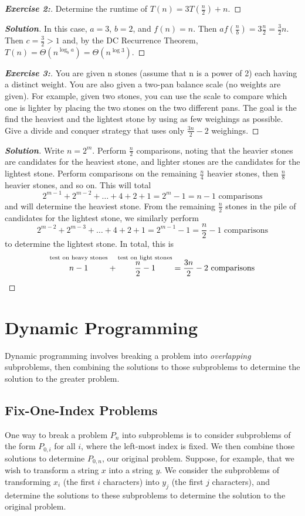 \documentclass[a4paper]{article}
\newenvironment{solution}{\begin{proof}[\textnormal{\textbf{Solution}}]}{\end{proof}}
\newenvironment{exercise}[1]{\begin{proof}[\textnormal{\textbf{Exercise #1:}}]\phantom{\qedhere}}{\end{proof}}
\theoremstyle{definition}
\begin{document}
\begin{exercise}{2}
 Determine the runtime of $T(n)=3T(\frac{n}{2})+n$.
\end{exercise}

\begin{solution}
 In this case, $a=3$, $b=2$, and $f(n)=n$. Then $af(\frac{n}{b})=3\frac{n}{2}=\frac{3}{2}n$. Then $c=\frac{3}{2}>1$ and, by the DC Recurrence Theorem, $T(n)=\Theta(n^{\log_ba})=\Theta(n^{\log{3}})$.
\end{solution}

\begin{exercise}{3}
You are given n stones (assume that n is a power of 2) each having a distinct weight. You are also given a two-pan balance scale (no weights are given). For example, given two stones, you can use the scale to compare which one is lighter by placing the two stones on the two different pans. The goal is the find the heaviest and the lightest stone by using as few weighings as possible. Give a divide and conquer strategy that uses only $\frac{3n}{2}-2$ weighings.
\end{exercise}

\begin{solution}
 Write $n=2^m$. Perform $\frac{n}{2}$ comparisons, noting that the heavier stones are candidates for the heaviest stone, and lighter stones are the candidates for the lightest stone. Perform comparisons on the remaining $\frac{n}{4}$ heavier stones, then $\frac{n}{8}$ heavier stones, and so on. This will total \[2^{m-1}+2^{m-2}+\hdots+4+2+1=2^m-1=n-1 \text{ comparisons}\] and will determine the heaviest stone. From the remaining $\frac{n}{2}$ stones in the pile of candidates for the lightest stone, we similarly perform \[2^{m-2}+2^{m-3}+\hdots+4+2+1=2^{m-1}-1=\frac{n}{2}-1 \text{ comparisons}\] to determine the lightest stone. In total, this is \[\overset{\text{test on heavy stones}}{\vphantom{\frac{n}{2}}n-1} + \overset{\text{test on light stones}}{\frac{n}{2}-1}=\frac{3n}{2}-2\text{ comparisons}\]
 \end{solution}

 \section{Dynamic Programming}
 Dynamic programming involves breaking a problem into \textit{overlapping} subproblems, then combining the solutions to those subproblems to determine the solution to the greater problem. 
\subsection{Fix-One-Index Problems}
One way to break a problem $P_n$ into subproblems is to consider subproblems of the form $P_{0,i}$ for all $i$, where the left-most index is fixed. We then combine those solutions to determine $P_{0,n}$, our original problem. Suppose, for example, that we wish to transform a string $x$ into a string $y$. We consider the subproblems of transforming $x_i$ (the first $i$ characters) into $y_j$ (the first $j$ characters), and determine the solutions to these subproblems to determine the solution to the original problem. 
\end{document}
